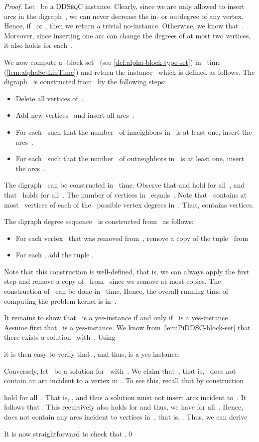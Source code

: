 \documentclass[a4paper,11pt]{article}
\theoremstyle{remark}
\theoremstyle{plain}
\theoremstyle{definition}
\newcommand{\DDSC}{\textsc{DDSeqC}\xspace}
\begin{document}
\begin{proof}
  Let~ be a \DDSC instance. Clearly, since we are only allowed to insert arcs in the digraph~, we can never decrease the in- or outdegree of any vertex. Hence, if~ or , then we return a trivial no-instance.
  Otherwise, we know that~.
  Moreover, since inserting one arc can change the degrees of at most two vertices, it also holds  for each~.

  We now compute a -block set~ (see \cref{def:alpha-block-type-set}) in~ time (\cref{lem:alphaSetLinTime}) and return the instance~ which is defined as follows.
  The digraph~ is constructed from~ by the following steps:
  \begin{itemize}
    \item Delete all vertices of~.
    \item Add  new vertices~ and insert all arcs~.
    \item For each~ such that the number~ of inneighbors in~ is at least one, insert the arcs~.
      \item For each~ such that the number~ of outneighbors in~ is at least one, insert the arcs~.
      \end{itemize}
      The digraph~ can be constructed in~ time.
  Observe that  and  hold for all~, and that~ holds for all~.
  The number of vertices in~ equals~. Note that~ contains at most~ vertices of each of the~ possible vertex degrees in~. Thus,  contains  vertices.
  
  The digraph degree sequence~ is constructed from~ as follows:
  \begin{itemize}
    \item For each vertex~ that was removed from~, remove a copy of the tuple~ from~
    \item For each , add the tuple .
    \end{itemize}
    Note that this construction is well-defined, that is, we can always apply the first step and remove a copy of~ from~ since we remove at most  copies.
    The construction of~ can be done in~ time. Hence, the overall running time of computing the problem kernel is in~.

    It remains to show that~ is a yes-instance if and only if~ is a yes-instance.
    Assume first that~ is a yes-instance. We know from \cref{lem:PiDDSC-block-set} that there exists a solution~ with~.
    Using
    
it is then easy to verify that~, and thus,  is a yes-instance.

Conversely, let~ be a solution for~
with~.
We claim that~, that is,~ does not contain an arc incident to a vertex in~. To see this, recall that by construction

hold for all~.
That is, , and thus a solution must not insert arcs incident to~. It follows that .
This recursively also holds for  and thus, we have  for all~.
Hence,  does not contain any arcs incident to vertices in~, that is, .
Thus, we can derive

It is now straightforward to check that .\qed
\end{proof}
\end{document}
